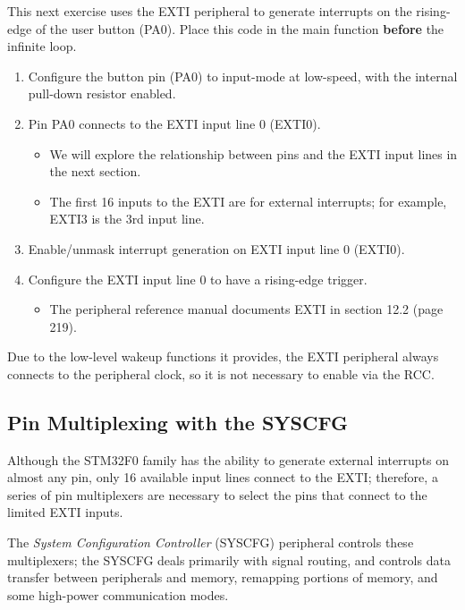 \documentclass[openany,11pt,fleqn]{book} %
\begin{document}
\begin{exercise}
    \label{ex2}
   This next exercise uses the EXTI peripheral to generate interrupts on the rising-edge of the user button (PA0). Place this code in the main function \textbf{before} the infinite loop. 
    \begin{enumerate}
        \item Configure the button pin (PA0) to input-mode at low-speed, with the internal pull-down resistor enabled. 
        \item Pin PA0 connects to the EXTI input line 0 (EXTI0). 
        \begin{itemize}
            \item We will explore the relationship between pins and the EXTI input lines in the next section. 
            \item The first 16 inputs to the EXTI are for external interrupts; for example, EXTI3 is the 3rd input line.
        \end{itemize}
        \item Enable/unmask interrupt generation on EXTI input line 0 (EXTI0).
        \item Configure the EXTI input line 0 to have a rising-edge trigger.
        \begin{itemize}
            \item The peripheral reference manual documents EXTI in section 12.2 (page 219).
        \end{itemize}
    \end{enumerate}

    \noindent Due to the low-level wakeup functions it provides, the EXTI peripheral always connects to the peripheral clock, so it is not necessary to enable via the RCC.   
\end{exercise}



\subsection{Pin Multiplexing with the SYSCFG} \label{syscfg}
Although the STM32F0 family has the ability to generate external interrupts on almost any pin, only 16 available input lines connect to the EXTI; therefore, a series of pin multiplexers are necessary to select the pins that connect to the limited EXTI inputs.  

The \textit{System Configuration Controller} (SYSCFG) peripheral controls these multiplexers; the SYSCFG deals primarily with signal routing, and controls data transfer between peripherals and memory, remapping portions of memory, and some high-power communication modes. 
\end{document}
